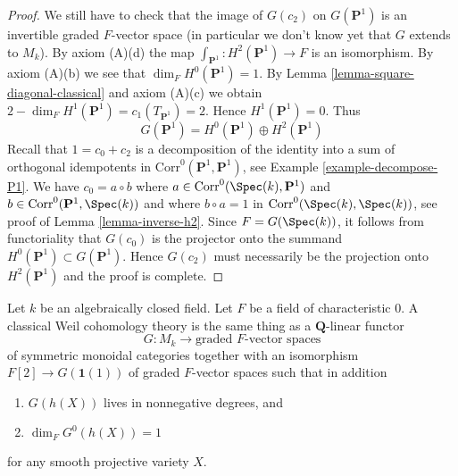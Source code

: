 \begin{proof}
\medskip\noindent
We still have to check that the image of $G(c_2)$ on $G(\mathbf{P}^1)$
is an invertible graded $F$-vector space (in particular we don't know yet
that $G$ extends to $M_k$).
By axiom (A)(d) the map $\int_{\mathbf{P}^1} : H^2(\mathbf{P}^1) \to F$
is an isomorphism. By axiom (A)(b) we see that $\dim_F H^0(\mathbf{P}^1) = 1$.
By Lemma \ref{lemma-square-diagonal-classical} and axiom (A)(c)
we obtain $2 - \dim_F H^1(\mathbf{P}^1) = c_1(T_{\mathbf{P}^1}) = 2$.
Hence $H^1(\mathbf{P}^1) = 0$. Thus
$$
G(\mathbf{P}^1) = H^0(\mathbf{P}^1) \oplus H^2(\mathbf{P}^1)
$$
Recall that $1 = c_0 + c_2$ is a decomposition of the identity
into a sum of orthogonal idempotents in
$\text{Corr}^0(\mathbf{P}^1, \mathbf{P}^1)$, see
Example \ref{example-decompose-P1}. We have $c_0 = a \circ b$ where
$a \in \text{Corr}^0(\Spec(k), \mathbf{P}^1)$ and
$b \in \text{Corr}^0(\mathbf{P}^1, \Spec(k))$ and where
$b \circ a = 1$ in $\text{Corr}^0(\Spec(k), \Spec(k))$, see proof of
Lemma \ref{lemma-inverse-h2}. Since $F = G(\Spec(k))$, it follows from
functoriality that $G(c_0)$ is the projector onto the summand
$H^0(\mathbf{P}^1) \subset G(\mathbf{P}^1)$. Hence
$G(c_2)$ must necessarily be the projection onto $H^2(\mathbf{P}^1)$
and the proof is complete.
\end{proof}

\begin{proposition}
\label{proposition-weil-cohomology-theory-classical}
Let $k$ be an algebraically closed field. Let $F$ be a field of
characteristic $0$. A classical Weil cohomology theory is the same thing
as a $\mathbf{Q}$-linear functor
$$
G : M_k \longrightarrow \text{graded }F\text{-vector spaces}
$$
of symmetric monoidal categories together with an isomorphism
$F[2] \to G(\mathbf{1}(1))$ of graded $F$-vector spaces such that
in addition
\begin{enumerate}
\item $G(h(X))$ lives in nonnegative degrees, and
\item $\dim_F G^0(h(X)) = 1$
\end{enumerate}
for any smooth projective variety $X$.
\end{proposition}

